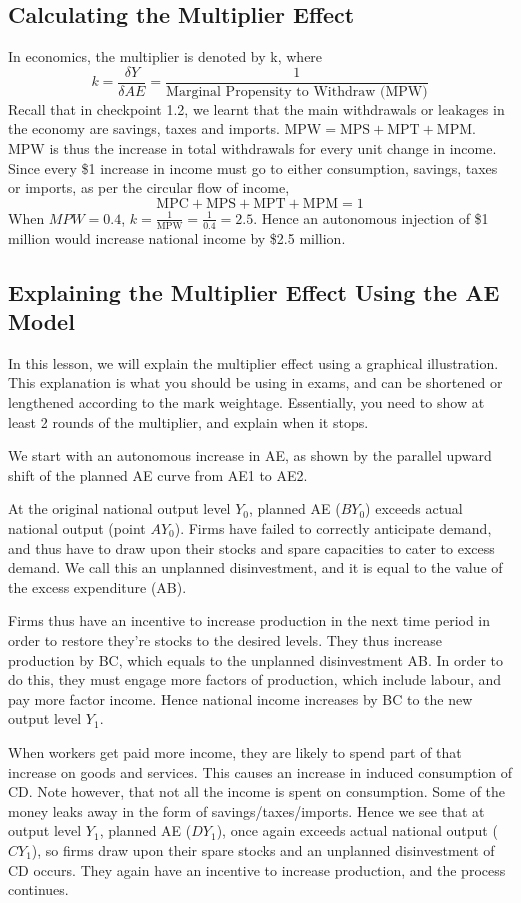 \subsection{Calculating the Multiplier Effect}
In economics, the multiplier is denoted by k, where 
$$k=\frac{\delta Y}{\delta AE}=\frac{1}{\textrm{Marginal Propensity to Withdraw (MPW)}}$$
Recall that in checkpoint 1.2, we learnt that the main withdrawals or leakages in the economy are savings, taxes and imports. $\textrm{MPW} = \textrm{MPS} + \textrm{MPT} + \textrm{MPM}$. MPW is thus the increase in total withdrawals for every unit change in income. Since every \$1 increase in income must go to either consumption, savings, taxes or imports, as per the circular flow of income,
$$\textrm{MPC} + \textrm{MPS} + \textrm{MPT} + \textrm{MPM} = 1$$
When $MPW=0.4$, $k=\frac{1}{\textrm{MPW}}=\frac{1}{0.4}=2.5$. Hence an autonomous injection of \$1 million would increase national income by \$2.5 million. 
\subsection{Explaining the Multiplier Effect Using the AE Model}
In this lesson, we will explain the multiplier effect using a graphical illustration. This explanation is what you should be using in exams, and can be shortened or lengthened according to the mark weightage. Essentially, you need to show at least 2 rounds of the multiplier, and explain when it stops. 

We start with an autonomous increase in AE, as shown by the parallel upward shift of the planned AE curve from AE1 to AE2. 

At the original national output level $Y_0$, planned AE ($BY_0$) exceeds actual national output (point $AY_0$). Firms have failed to correctly anticipate demand, and thus have to draw upon their stocks and spare capacities to cater to excess demand. We call this an unplanned disinvestment, and it is equal to the value of the excess expenditure (AB).

Firms thus have an incentive to increase production in the next time period in order to restore they’re stocks to the desired levels. They thus increase production by BC, which equals to the unplanned disinvestment AB. In order to do this, they must engage more factors of production, which include labour, and pay more factor income. Hence national income increases by BC to the new output level $Y_1$.

When workers get paid more income, they are likely to spend part of that increase on goods and services. This causes an increase in induced consumption of CD. Note however, that not all the income is spent on consumption. Some of the money leaks away in the form of savings/taxes/imports. Hence we see that at output level $Y_1$, planned AE ($DY_1$), once again exceeds actual national output ($CY_1$), so firms draw upon their spare stocks and an unplanned disinvestment of CD occurs. They again have an incentive to increase production, and the process continues. 

